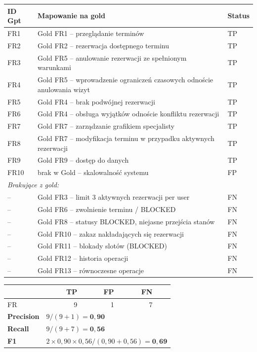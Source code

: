 \documentclass[12pt,a4paper]{article}
\newcommand{\tp}[1]{\colorbox{tpcolor}{\small #1}}
\newcommand{\fp}[1]{\colorbox{fpcolor}{\small #1}}
\newcommand{\fn}[1]{\colorbox{fncolor}{\small #1}}
\begin{document}
\begin{tabular}{p{2.5cm} p{7cm} l}
\toprule
\textbf{ID Gpt} & \textbf{Mapowanie na gold} & \textbf{Status} \\
\midrule
FR1 & Gold FR1 -- przeglądanie terminów & \tp{TP} \\
FR2 & Gold FR2 -- rezerwacja dostępnego terminu & \tp{TP} \\
FR3 & Gold FR5 -- anulowanie rezerwacji ze spełnionym warunkami & \tp{TP} \\
FR4 & Gold FR5 -- wprowadzenie ograniczeń czasowych odnoście anulowania wizyt & \tp{TP} \\
FR5 & Gold FR4 -- brak podwójnej rezerwacji & \tp{TP} \\
FR6 & Gold FR4 -- obsługa wyjątków odnoście konfliktu rezerwacji & \tp{TP} \\
FR7 & Gold FR7 -- zarządzanie grafikiem specjalisty & \tp{TP} \\
FR8 & Gold FR7 -- modyfikacja terminu w przypadku aktywnych rezerwacji & \tp{TP} \\
FR9 & Gold FR9 -- dostęp do danych & \tp{TP} \\
FR10 & brak w Gold -- skalowalność systemu & \fp{FP} \\

\midrule
\multicolumn{3}{l}{\textit{Brakujące z gold:}} \\
-- & Gold FR3 -- limit 3 aktywnych rezerwacji per user & \fn{FN} \\
-- & Gold FR6 -- zwolnienie terminu / BLOCKED & \fn{FN} \\
-- & Gold FR8 -- statusy BLOCKED, niejasne przejścia stanów & \fn{FN} \\
-- & Gold FR10 -- zakaz nakładających się rezerwacji & \fn{FN} \\
-- & Gold FR11 -- blokady slotów (BLOCKED) & \fn{FN} \\
-- & Gold FR12 -- historia operacji & \fn{FN} \\
-- & Gold FR13 -- równoczesne operacje & \fn{FN} \\
\bottomrule
\end{tabular}

\vspace{0.5em}
\begin{tabular}{lrrrr}
\toprule
& \textbf{TP} & \textbf{FP} & \textbf{FN} & \\
\midrule
FR & 9 & 1 & 7 & \\
\midrule
\textbf{Precision} & \multicolumn{4}{l}{$9 / (9+1) = \mathbf{0{,}90}$} \\
\textbf{Recall}    & \multicolumn{4}{l}{$9 / (9+7) = \mathbf{0{,}56}$} \\
\textbf{F1}        & \multicolumn{4}{l}{$2 \times 0{,}90 \times 0{,}56 / (0{,}90+0{,}56) = \mathbf{0{,}69}$} \\
\bottomrule
\end{tabular}
\end{document}
